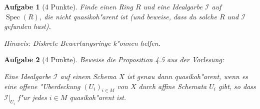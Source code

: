 \documentclass[paper = A4, fontsize=12pt, numbers=noendperiod, chapterprefix=true]{scrbook}
\theoremstyle{break}
\newtheorem{Aufg}{Aufgabe}
\theoremstyle{nonumberbreak}
\theoremstyle{nonumberplain}
\DeclareMathOperator{\Spec}{Spec}
\begin{document}
\begin{Aufg}[4 Punkte]
 Finde einen Ring $R$ und eine Idealgarbe $\mathcal{I}$ auf $\Spec(R)$, die nicht quasikoh"arent ist (und beweise, dass du solche $R$ und $\mathcal{I}$ gefunden hast).

\textit{Hinweis: Diskrete Bewertungsringe k"onnen helfen.}
\end{Aufg}

\begin{Aufg}[4 Punkte]
 Beweise die Proposition 4.5 aus der Vorlesung:

Eine Idealgarbe $\mathcal{I}$ auf einem Schema $X$ ist genau dann quasikoh"arent, wenn es eine offene "Uberdeckung $(U_i)_{i \in M}$ von $X$ durch affine Schemata $U_i$ gibt, so dass $\mathcal{I}|_{U_i}$ f"ur jedes $i \in M$ quasikoh"arent ist.
\end{Aufg}
\end{document}
